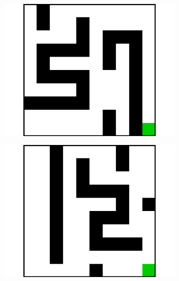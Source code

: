 \documentclass{article}
\begin{document}
\begin{figure}[t]
  \begin{subfigure}[t]{0.18\textwidth}
    \includegraphics[width=\textwidth]{images/maze/maze15.pdf}
    \caption{}
  \end{subfigure}
  \begin{subfigure}[t]{0.18\textwidth}
    \includegraphics[width=\textwidth]{images/maze/maze16.pdf}
    \caption{}
  \end{subfigure}
  \begin{subfigure}[t]{0.18\textwidth}

\end{subfigure}
\end{figure}
\end{document}
